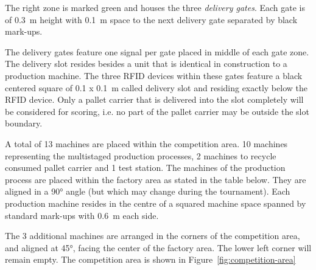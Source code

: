 \documentclass[12pt,twoside]{article}
\begin{document}
The right zone is marked green and houses the three \textit{delivery
  gates}.  Each gate is of \SI{0.3}{\metre} height with
\SI{0.1}{\metre} space to the next delivery gate separated by black
mark-ups.

The delivery gates feature one signal per gate placed in middle of
each gate zone. The delivery slot resides besides a unit that is
identical in construction to a production machine. The three RFID
devices within these gates feature a black centered square of \SI{0.1
  x 0.1}{\metre} called delivery slot and residing exactly below the
RFID device. Only a pallet carrier that is delivered into the slot
completely will be considered for scoring, i.e. no part of the pallet
carrier may be outside the slot boundary.

A total of 13 machines are placed within the competition area. 10
machines representing the multistaged production processes, 2 machines to
recycle consumed pallet carrier and 1 test station. The machines of
the production process are placed within the factory area as stated in
the table below. They are aligned in a \ang{90} angle (but which may
change during the tournament). Each production machine resides in the
centre of a squared machine space spanned by standard mark-ups with
\SI{0.6}{\metre} each side.

The 3 additional machines are arranged in the corners of the
competition area, and aligned at \ang{45}, facing the center of the
factory area. The lower left corner will remain empty. The competition
area is shown in Figure~\ref{fig:competition-area}
\end{document}
